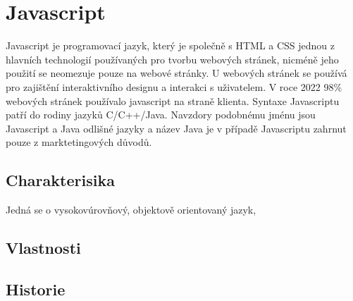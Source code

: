 \documentclass[main.tex]{subfiles}
\begin{document}
\section{Javascript}
Javascript je programovací jazyk, který je společně s HTML a CSS jednou z hlavních technologií používaných pro tvorbu webových stránek, nicméně jeho použití se neomezuje pouze na webové stránky. U webových stránek se používá pro zajištění interaktivního designu a interakci s uživatelem. V roce 2022 98\% webových stránek používalo javascript na straně klienta. Syntaxe Javascriptu patří do rodiny jazyků C/C++/Java. Navzdory podobnému jménu jsou Javascript a Java odlišné jazyky a název Java je v případě Javascriptu zahrnut pouze z marktetingových důvodů.

\subsection{Charakterisika}
Jedná se o vysokovúrovňový, objektově orientovaný jazyk,

\subsection{Vlastnosti}



\subsection{Historie}
\end{document}
